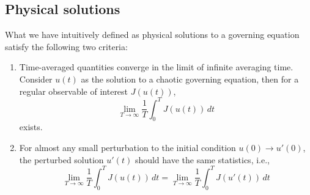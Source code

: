 \documentclass[preprint,12pt]{elsarticle}
\begin{document}
\subsection{Physical solutions}
What we have intuitively defined as physical solutions to a governing equation satisfy the following
two criteria: 
\begin{enumerate}
    \item Time-averaged quantities converge in the limit of infinite averaging time.
    Consider $u(t)$ as the solution to a chaotic governing equation, then for a regular observable
    of interest $J(u(t))$,
    \begin{equation} \label{longtimeavg}
        \lim_{T\to\infty}\frac1T \int_0^T J(u(t))\,dt
    \end{equation}
    exists.
    \item For almost any small perturbation to the initial condition $u(0)\to u'(0)$, the perturbed
    solution $u'(t)$ should have the same statistics, i.e.,
    \begin{equation}
        \lim_{T\to\infty}\frac1T \int_0^T J(u(t))\,dt
      = \lim_{T\to\infty}\frac1T \int_0^T J(u'(t))\,dt
    \end{equation}
\end{enumerate}
\end{document}
